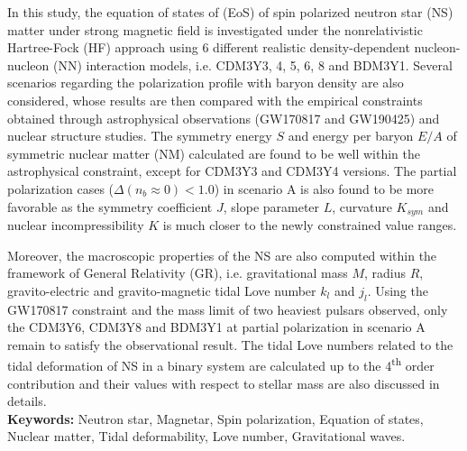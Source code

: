 In this study, the equation of states of (\gls{EoS}) of spin polarized neutron star (\gls{NS}) matter under strong magnetic field is investigated under the nonrelativistic Hartree-Fock (\gls{HF}) approach using 6 different realistic density-dependent nucleon-nucleon (\gls{NN}) interaction models, i.e. CDM3Y3, 4, 5, 6, 8 and BDM3Y1. Several scenarios regarding the polarization profile with baryon density are also considered, whose results are then compared with the empirical constraints obtained through astrophysical observations (GW170817 and GW190425) and nuclear structure studies. The symmetry energy $S$ and energy per baryon $E/A$ of symmetric nuclear matter (\gls{NM}) calculated are found to be well within the astrophysical constraint, except for CDM3Y3 and CDM3Y4 versions. The partial polarization cases ($\Delta(n_b\approx 0) < 1.0$) in scenario A is also found to be more favorable as the symmetry coefficient $J$, slope parameter $L$, curvature $K_{sym}$ and nuclear incompressibility $K$ is much closer to the newly constrained value ranges.\par
Moreover, the macroscopic properties of the \gls{NS} are also computed within the framework of General Relativity (\gls{GR}), i.e. gravitational mass $M$, radius $R$, gravito-electric and gravito-magnetic tidal Love number $k_l$ and $j_l$. Using the GW170817 constraint and the mass limit of two heaviest pulsars observed, only the CDM3Y6, CDM3Y8 and BDM3Y1 at partial polarization in scenario A remain to satisfy the observational result. The tidal Love numbers related to the tidal deformation of \gls{NS} in a binary system are calculated up to the 4\textsuperscript{th} order contribution and their values with respect to stellar mass are also discussed in details.\\[5mm]
\textbf{Keywords:} Neutron star, Magnetar, Spin polarization, Equation of states, Nuclear matter, Tidal deformability, Love number, Gravitational waves.
